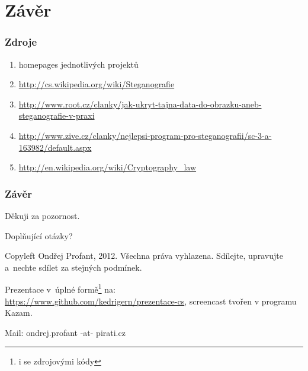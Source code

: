\documentclass[xetex]{beamer}
\begin{document}
\section{Závěr}

\begin{frame}
	\frametitle{Zdroje}
	
	\begin{enumerate}
	\item homepages jednotlivých projektů
	\item \url{http://cs.wikipedia.org/wiki/Steganografie}
	\item \scriptsize{\url{http://www.root.cz/clanky/jak-ukryt-tajna-data-do-obrazku-aneb-steganografie-v-praxi}}
	\item \scriptsize{\url{http://www.zive.cz/clanky/nejlepsi-program-pro-steganografii/sc-3-a-163982/default.aspx}}
	\item \url{http://en.wikipedia.org/wiki/Cryptography\_law}
	\end{enumerate}
\end{frame}

\begin{frame}
  \frametitle{Závěr}
	Děkuji za pozornost.

	\bigskip
	
	Doplňující otázky?

	\bigskip

	\bigskip

	\scriptsize
	Copyleft Ondřej Profant, 2012. Všechna práva vyhlazena. Sdílejte, upravujte a~nechte sdílet za stejných podmínek. 

	\bigskip

	Prezentace v~úplné formě\footnote{i se zdrojovými kódy} na:\\ 
	\url{https://www.github.com/kedrigern/prezentace-cs}, screencast tvořen v programu Kazam.

	\bigskip

	Mail: ondrej.profant -at- pirati.cz 
\end{frame}
\end{document}
